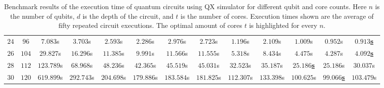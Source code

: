 \begin{table}[ht]
\begin{adjustwidth}{-1.2cm}{-1.2cm}
{\begin{tabular}{ccccccccccccc}
            $24$ & $96$ & $7.083$s & $3.703$s & $2.593$s & $2.286$s & $2.976$s & $2.723$s & $1.196$s & $2.109$s & $1.009$s & $0.952$s & \underline{$\mathbf{0.913}$\textbf{s}} \\
            $26$ & $104$ & $29.827$s & $16.296$s & $11.385$s & $9.991$s & $11.566$s & $11.555$s & $5.318$s & $8.434$s & $4.475$s & $4.287$s & \underline{$\mathbf{4.092}$\textbf{s}} \\
            $28$ & $112$ & $123.789$s & $68.968$s & $48.236$s & $42.365$s & $45.519$s & $45.031$s & $32.523$s & $35.187$s & \underline{$\mathbf{25.186}$\textbf{s}} & $25.186$s & $30.037$s \\
            $30$ & $120$ & $619.899$s & $292.743$s & $204.698$s & $179.886$s & $183.584$s & $181.825$s & $112.307$s & $133.398$s & $100.625$s & \underline{$\mathbf{99.066}$\textbf{s}} & $103.479$s \\
            
        \end{tabular}
    }
    \end{adjustwidth}
    \caption[Benchmark results of the execution time of quantum circuits using QX simulator for different qubit and core counts.]{
        Benchmark results of the execution time of quantum circuits using QX simulator for different qubit and core counts.
        Here $n$ is the number of qubits, $d$ is the depth of the circuit, and $t$ is the number of cores.
        Execution times shown are the average of fifty repeated circuit executions.
        The optimal amount of cores $t$ is highlighted for every $n$.
    }
    \label{table:qx_benchmark}
\end{table}